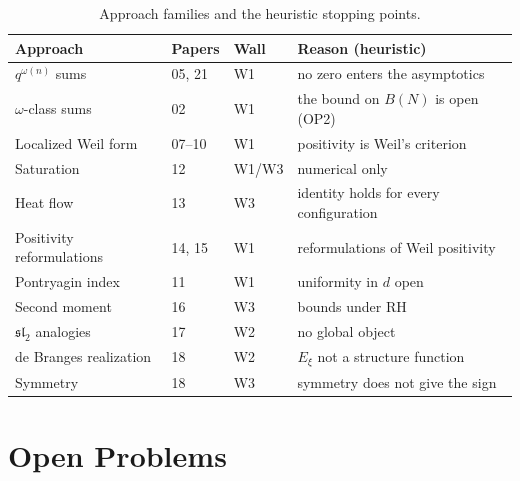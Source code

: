 \documentclass[11pt]{amsart}
\theoremstyle{definition}
\theoremstyle{remark}
\newcommand{\om}{\omega}
\begin{document}
\begin{table}[h]
\small
\renewcommand{\arraystretch}{1.3}
\centering
\begin{tabularx}{\textwidth}{>{\raggedright\arraybackslash}p{3.4cm}l l>{\raggedright\arraybackslash}X}
\toprule
Approach & Papers & Wall & Reason (heuristic) \\
\midrule
$q^{\om(n)}$ sums & 05, 21 & W1 & no zero enters the asymptotics \\
$\om$-class sums & 02 & W1 & the bound on $B(N)$ is open (OP2) \\
Localized Weil form & 07--10 & W1 & positivity is Weil's criterion \\
Saturation & 12 & W1/W3 & numerical only \\
Heat flow & 13 & W3 & identity holds for every configuration \\
Positivity reformulations & 14, 15 & W1 & reformulations of Weil positivity \\
Pontryagin index & 11 & W1 & uniformity in $d$ open \\
Second moment & 16 & W3 & bounds under RH \\
$\mathfrak{sl}_2$ analogies & 17 & W2 & no global object \\
de Branges realization & 18 & W2 & $E_\xi$ not a structure function \\
Symmetry & 18 & W3 & symmetry does not give the sign \\
\bottomrule
\end{tabularx}
\caption{Approach families and the heuristic stopping points.}
\label{tab:walls}
\end{table}

\section{Open Problems}
\label{sec:open}
\end{document}
